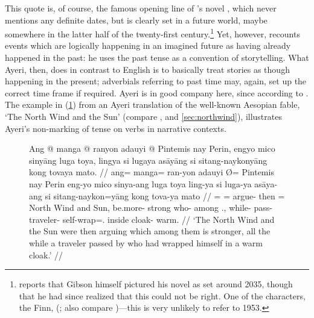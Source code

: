 This quote is, of course, the famous opening line of
\citeauthor{gibson:neuromancer}'s 
novel , which never mentions any definite dates,
but is clearly set in a future world, maybe somewhere in the latter half of the
twenty-first century.\footnote{\citet{christian2017} reports that Gibson
himself pictured his novel as set around 2035, though that he had since
realized that this could not be right. One of the characters, the Finn,
(\cite{christian2017}; also compare \cite[Ch.~5]{gibson:neuromancer})---this is
very unlikely to refer to 1953.} Yet, however, \citeauthor{gibson:neuromancer}
recounts events which are logically happening in an imagined future as having
already happened in the past: he uses the past tense as a convention of
storytelling. What Ayeri, then, does in contrast to English is to basically
treat stories as though happening in the present; adverbials referring to past
time may, again, set up the correct time frame if required. Ayeri is in good
company here, since according to \citet{dahl1985}
. The example in (\ref{ex:nonarrpst}) from an
Ayeri translation of the well-known Aesopian fable, `The North Wind and the
Sun' (compare \cite[39]{ipa2007}, and \autoref{sec:northwind}), illustrates
Ayeri's non-marking of tense on verbs in narrative contexts.

\begin{figure}
\ex\label{ex:nonarrpst}
\begingl
	\gla Ang @ manga @ ranyon adauyi {} @ Pintemis nay Perin, engyo mico 
		sinyāng luga toya, lingya si lugaya asāyāng si sitang-naykonyāng 
		kong tovaya mato. //
	\glb ang= manga= ran-yon adauyi Ø= Pintemis nay Perin eng-yo mico 
		sinya-ang luga toya ling-ya si luga-ya asāya-ang si 
		sitang-naykon=yāng kong tova-ya mato //
	\glc \AgtT{}= \Prog{}= argue-\TplN{} then \Top{}= {North Wind} and 
		Sun, be.more-\TsgN{} strong who-\Aarg{} among \TplN{}.\Loc{},
		while-\Loc{} \Rel{} pass-\TsgM{} traveler-\Aarg{} \Rel{}
		self-wrap=\TsgM{}.\Aarg{} inside cloak-\Loc{} warm. //
	\glft `The North Wind and the Sun were then arguing which among them is 
		stronger, all the while a traveler passed by who had wrapped 
		himself in a warm cloak.' //
\endgl
\xe
\end{figure}

